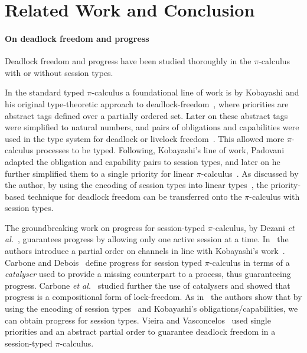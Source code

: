 \documentclass[main.tex]{subfiles}
\begin{document}
\section{Related Work and Conclusion}

\paragraph{On deadlock freedom and progress}
Deadlock freedom and progress have been studied thoroughly in the $\pi$-calculus with or without session types.

In the standard typed $\pi$-calculus a foundational line of work is by Kobayashi and his original type-theoretic approach to deadlock-freedom~\cite{kobayashi98}, where priorities are abstract tags defined over a partially ordered set. Later on these abstract tags were simplified to natural numbers, and pairs of obligations and capabilities were used in the type system for deadlock or livelock freedom~\cite{kobayashi02,kobayashi06}. This allowed more $\pi$-calculus processes to be typed. Following, Kobayashi's line of work, Padovani~\cite{padovani13} adapted the obligation and capability pairs to session types, and later on he further simplified them to a single priority for linear $\pi$-calculus~\cite{padovani14}. As discussed by the author, by using the encoding of session types into linear types~\cite{kobayashi07,dardhagiachino12,dardha14beat,dardha16}, the priority-based technique for deadlock freedom can be transferred onto the $\pi$-calculus with session types.

The groundbreaking work on progress for session-typed $\pi$-calculus, by Dezani \emph{et al.}~\cite{dezani-ciancaglinimostrous06}, guarantees progress by allowing only one active session at a time. In~\cite{dezani-ciancagliniliguoro09progress} the authors introduce a partial order on channels in line with Kobayashi's work~\cite{kobayashi98}. Carbone and Debois~\cite{carbonedebois10} define progress for session typed $\pi$-calculus in terms of a \emph{catalyser} used to provide a missing counterpart to a process, thus guaranteeing progress.
Carbone \emph{et al.}~\cite{carbonedardha14} studied further the use of catalysers and showed that progress is a compositional form of lock-freedom. As in~\cite{padovani14} the authors show that by using the encoding of session types~\cite{dardhagiachino12} and Kobayashi's obligations/capabilities, we can obtain progress for session types. Vieira and Vasconcelos~\cite{vieiravasconcelos13} used single priorities and an abstract partial order to guarantee deadlock freedom in a session-typed $\pi$-calculus.
\end{document}

